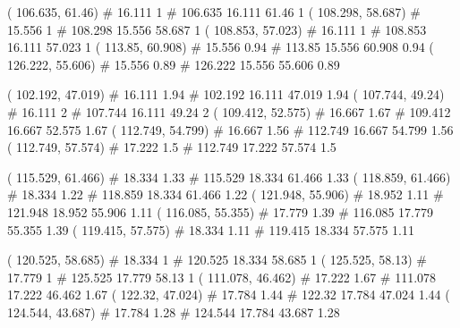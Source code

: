 \documentclass[a4paper,openbib,10pt]{article}
\newenvironment{treegraph}{\begin{graph}}{\end{graph}}
\begin{document}
\begin{treegraph}
  ( 106.635, 61.46) #     16.111    1
   #    106.635    16.111    61.46    1
  ( 108.298, 58.687) #     15.556    1
   #    108.298    15.556    58.687    1
  ( 108.853, 57.023) #     16.111    1
   #    108.853    16.111    57.023    1
  ( 113.85, 60.908) #     15.556    0.94
   #    113.85    15.556    60.908    0.94
  ( 126.222, 55.606) #     15.556    0.89
   #    126.222    15.556    55.606    0.89

  ( 102.192, 47.019) #     16.111    1.94
   #    102.192    16.111    47.019    1.94
  ( 107.744, 49.24) #     16.111    2
   #    107.744    16.111    49.24    2
  ( 109.412, 52.575) #     16.667    1.67
   #    109.412    16.667    52.575    1.67
  ( 112.749, 54.799) #     16.667    1.56
   #    112.749    16.667    54.799    1.56
  ( 112.749, 57.574) #     17.222    1.5
   #    112.749    17.222    57.574    1.5

  ( 115.529, 61.466) #     18.334    1.33
   #    115.529    18.334    61.466    1.33
  ( 118.859, 61.466) #     18.334    1.22
   #    118.859    18.334    61.466    1.22
  ( 121.948, 55.906) #     18.952    1.11
   #    121.948    18.952    55.906    1.11
  ( 116.085, 55.355) #     17.779    1.39
   #    116.085    17.779    55.355    1.39
  ( 119.415, 57.575) #     18.334    1.11
   #    119.415    18.334    57.575    1.11

  ( 120.525, 58.685) #     18.334    1
   #    120.525    18.334    58.685    1
  ( 125.525, 58.13) #     17.779    1
   #    125.525    17.779    58.13    1
  ( 111.078, 46.462) #     17.222    1.67
   #    111.078    17.222    46.462    1.67
  ( 122.32, 47.024) #     17.784    1.44
   #    122.32    17.784    47.024    1.44
  ( 124.544, 43.687) #     17.784    1.28
   #    124.544    17.784    43.687    1.28


\end{treegraph}
\end{document}
